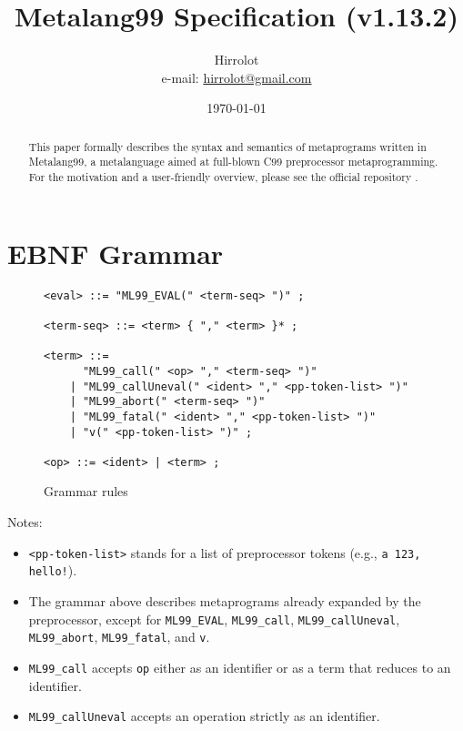 \documentclass[12pt]{article}
\theoremstyle{break}
\begin{document}
\title{Metalang99 Specification (v1.13.2)}
\date{\today}
\author{Hirrolot \\ e-mail: \href{mailto:hirrolot@gmail.com}{hirrolot@gmail.com}}
\maketitle

\begin{abstract}
This paper formally describes the syntax and semantics of metaprograms written in Metalang99,
a metalanguage aimed at full-blown C99 preprocessor metaprogramming. For the motivation and
a user-friendly overview, please see the official repository \cite{Metalang99}.
\end{abstract}

\tableofcontents

\newpage

\section{EBNF Grammar}

\begin{figure}[H]
    \caption{Grammar rules}

\begin{verbatim}
<eval> ::= "ML99_EVAL(" <term-seq> ")" ;

<term-seq> ::= <term> { "," <term> }* ;

<term> ::=
      "ML99_call(" <op> "," <term-seq> ")"
    | "ML99_callUneval(" <ident> "," <pp-token-list> ")"
    | "ML99_abort(" <term-seq> ")"
    | "ML99_fatal(" <ident> "," <pp-token-list> ")"
    | "v(" <pp-token-list> ")" ;

<op> ::= <ident> | <term> ;
\end{verbatim}

\end{figure}

Notes:

\begin{itemize}
    \item \texttt{<pp-token-list>} stands for a list of preprocessor tokens (e.g., \texttt{a 123, hello!}).
    \item The grammar above describes metaprograms already expanded by the preprocessor,
    except for \texttt{ML99\_EVAL}, \texttt{ML99\_call}, \texttt{ML99\_callUneval}, \\
    \texttt{ML99\_abort}, \texttt{ML99\_fatal}, and \texttt{v}.
    \item \texttt{ML99\_call} accepts \texttt{op} either as an identifier or as a term that
    reduces to an identifier.
    \item \texttt{ML99\_callUneval} accepts an operation strictly as an identifier.
\end{itemize}
\end{document}
